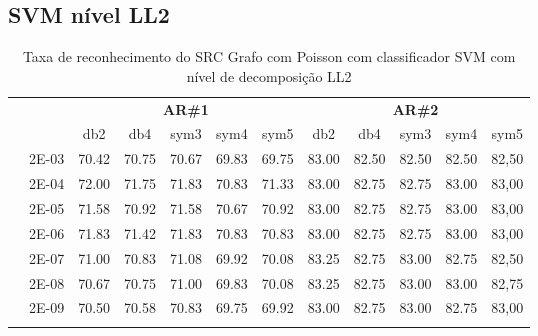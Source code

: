 \begin{table}[H]
\begin{tabular}{|c|c|c c c c c|c c c c c|}
\\\midrule
\end{tabular}

\end{table}






\subsection{SVM nível LL2}

\begin{table}[H]
	\centering
    \normalsize
	\caption{Taxa de reconhecimento do SRC Grafo com Poisson com classificador SVM com nível de decomposição LL2}
	\begin{tabular}{|c|c|c c c c c|c c c c c|}
\cline{3-12}
\multicolumn{2}{c|}{\multirow{2}{*}{}} & \multicolumn{5}{c|}{\textbf{AR\#1}}  & \multicolumn{5}{c|}{\textbf{AR\#2}} \\\cline{3-12}

\multicolumn{2}{c|}{}  & db2 & db4 & sym3 & sym4 & sym5 & db2 & db4& sym3 & sym4 & sym5 \\\hline
\multicolumn{1}{|c|}{ \multirow{6}{*}{\rotatebox[origin=c]{90}{\textbf{Gamma}}} }
&2E-03&	70.42&	70.75&	70.67&	69.83&	69.75	&83.00 &	82.50&	82.50&	82.50&	82,50	\\\cline{2-12}
&2E-04&	72.00&	71.75&	71.83&	70.83&	71.33	&83.00 &	82.75&	82.75&	83.00&	83,00	\\\cline{2-12}
&2E-05&	71.58&	70.92&	71.58&	70.67&	70.92	&83.00 &	82.75&	82.75&	83.00&	83,00	\\\cline{2-12}
&2E-06&	71.83&	71.42&	71.83&	70.83&	70.83	&83.00 &	82.75&	82.75&	83.00&	83,00	\\\cline{2-12}
&2E-07&	71.00&	70.83&	71.08&	69.92&	70.08	&83.25 &	82.75&	83.00&	82.75&	82,50	\\\cline{2-12}
&2E-08&	70.67&	70.75&	71.00&	69.83&	70.08	&83.25 &	82.75&	83.00&	83.00&	82,75	\\\cline{2-12}
&2E-09&	70.50&	70.58&	70.83&	69.75&	69.92	&83.00 &	82.75&	83.00&	82.75&	83,00	
	

	
\\ \midrule
\multicolumn{12}{c}{}\\ 


\end{tabular}
\end{table}
